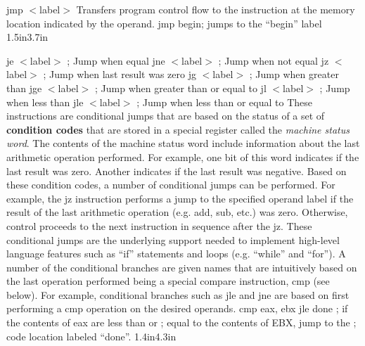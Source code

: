 {jmp $<$label$>$}
{Transfers program control flow to the instruction at the memory
  location indicated by the operand.}
{jmp begin}{; jumps to the ``begin'' label}
{1.5in}{3.7in}

{je $<$label$>$ ; Jump when equal\newline
jne $<$label$>$ ; Jump when not equal\newline
jz $<$label$>$ ; Jump when last result was zero\newline
jg $<$label$>$ ; Jump when greater than\newline
jge $<$label$>$ ; Jump when greater than or equal to\newline
jl $<$label$>$ ; Jump when less than\newline
jle $<$label$>$ ; Jump when less than or equal to}
{These instructions are conditional jumps that are based on the status
  of a set of {\bf condition codes} that are stored in a special
  register called the {\em machine status word}. The contents of the
  machine status word include information about the last arithmetic
  operation performed. For example, one bit of this word indicates if
  the last result was zero. Another indicates if the last result was
  negative.  Based on these condition codes, a number of conditional
  jumps can be performed. For example, the jz instruction performs a
  jump to the specified operand label if the result of the last
  arithmetic operation (e.g. add, sub, etc.) was zero. Otherwise,
  control proceeds to the next instruction in sequence after the jz.
  These conditional jumps are the underlying support needed to
  implement high-level language features such as ``if'' statements and
  loops (e.g. ``while'' and ``for''). \vspace{6pt}\newline
  A number of the conditional branches are given names that are
  intuitively based on the last operation performed being a special
  compare instruction, cmp (see below).  For example, conditional
  branches such as jle and jne are based on first performing a cmp
  operation on the desired operands.}
{cmp eax, ebx \newline jle done}
{; if the contents of eax are less than or \newline
; equal to the contents of EBX, jump to the \newline
; code location labeled ``done''.}
{1.4in}{4.3in}

